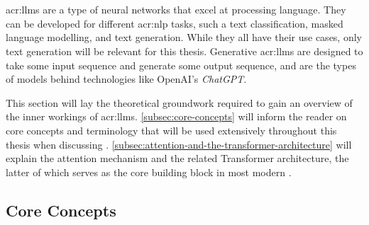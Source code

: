 






\section[Large Language Models]{}
\label{sec:llms}

\glspl{acr:llm} are a type of neural networks that excel at processing language. They can be developed for different \gls{acr:nlp} tasks, such a text classification, masked language modelling, and text generation. While they all have their use cases, only text generation will be relevant for this thesis. Generative \glspl{acr:llm} are designed to take some input sequence and generate some output sequence, and are the types of models behind technologies like OpenAI's \textit{ChatGPT}\citep{openaiIntroducingChatGPT2022}.

This section will lay the theoretical groundwork required to gain an overview of the inner workings of \glspl{acr:llm}. \autoref{subsec:core-concepts} will inform the reader on core concepts and terminology that will be used extensively throughout this thesis when discussing . \autoref{subsec:attention-and-the-transformer-architecture} will explain the attention mechanism and the related Transformer architecture, the latter of which serves as the core building block in most modern .


\subsection{Core Concepts}
\label{subsec:core-concepts}

